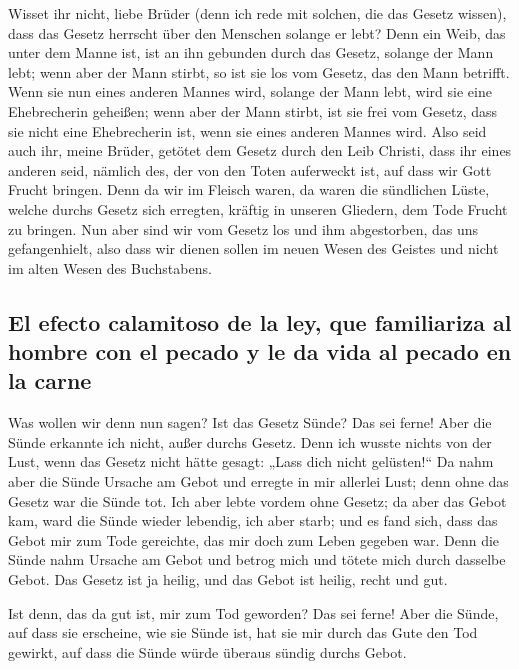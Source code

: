  Wisset ihr nicht, liebe Brüder (denn ich rede mit
solchen, die das Gesetz wissen), dass das Gesetz herrscht über den
Menschen solange er lebt?  Denn ein Weib, das unter dem
Manne ist, ist an ihn gebunden durch das Gesetz, solange der Mann lebt;
wenn aber der Mann stirbt, so ist sie los vom Gesetz, das den Mann
betrifft.  Wenn sie nun eines anderen Mannes wird, solange
der Mann lebt, wird sie eine Ehebrecherin geheißen; wenn aber der Mann
stirbt, ist sie frei vom Gesetz, dass sie nicht eine Ehebrecherin ist,
wenn sie eines anderen Mannes wird.  Also seid auch ihr,
meine Brüder, getötet dem Gesetz durch den Leib Christi, dass ihr eines
anderen seid, nämlich des, der von den Toten auferweckt ist, auf dass
wir Gott Frucht bringen.  Denn da wir im Fleisch waren, da
waren die sündlichen Lüste, welche durchs Gesetz sich erregten, kräftig
in unseren Gliedern, dem Tode Frucht zu bringen.  Nun aber
sind wir vom Gesetz los und ihm abgestorben, das uns gefangenhielt, also
dass wir dienen sollen im neuen Wesen des Geistes und nicht im alten
Wesen des Buchstabens.

\hypertarget{el-efecto-calamitoso-de-la-ley-que-familiariza-al-hombre-con-el-pecado-y-le-da-vida-al-pecado-en-la-carne}{%
\subsection{El efecto calamitoso de la ley, que familiariza al hombre
con el pecado y le da vida al pecado en la
carne}\label{el-efecto-calamitoso-de-la-ley-que-familiariza-al-hombre-con-el-pecado-y-le-da-vida-al-pecado-en-la-carne}}

 Was wollen wir denn nun sagen? Ist das Gesetz Sünde? Das
sei ferne! Aber die Sünde erkannte ich nicht, außer durchs Gesetz. Denn
ich wusste nichts von der Lust, wenn das Gesetz nicht hätte gesagt:
„Lass dich nicht gelüsten!{}``  Da nahm aber die Sünde
Ursache am Gebot und erregte in mir allerlei Lust; denn ohne das Gesetz
war die Sünde tot.  Ich aber lebte vordem ohne Gesetz; da
aber das Gebot kam, ward die Sünde wieder lebendig,  ich
aber starb; und es fand sich, dass das Gebot mir zum Tode gereichte, das
mir doch zum Leben gegeben war.  Denn die Sünde nahm
Ursache am Gebot und betrog mich und tötete mich durch dasselbe Gebot.
 Das Gesetz ist ja heilig, und das Gebot ist heilig,
recht und gut.

 Ist denn, das da gut ist, mir zum Tod geworden? Das sei
ferne! Aber die Sünde, auf dass sie erscheine, wie sie Sünde ist, hat
sie mir durch das Gute den Tod gewirkt, auf dass die Sünde würde überaus
sündig durchs Gebot.

